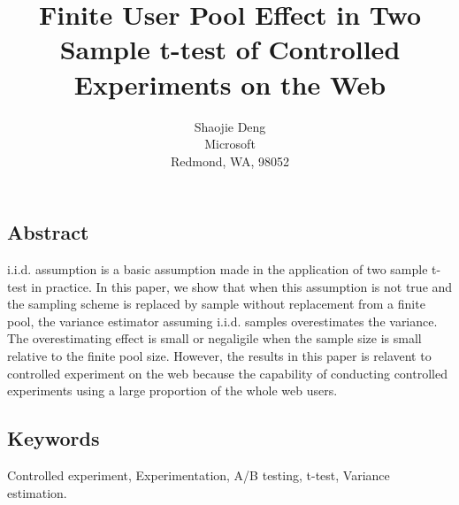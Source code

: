 \documentclass[10pt]{article}
\begin{document}
\date{}

\title{\Large\bf Finite User Pool Effect in Two Sample t-test of Controlled Experiments on the Web}

\author{Shaojie Deng \\
  Microsoft \\
  Redmond, WA, 98052}


\maketitle

\thispagestyle{empty}

\subsection*{Abstract}
i.i.d. assumption is a basic assumption made in the application of two sample t-test in practice. In this paper, we show that when this assumption is not true and the sampling scheme is replaced by sample without replacement from a finite pool, the variance estimator assuming i.i.d. samples overestimates the variance. The overestimating effect is small or negaligile when the sample size is small relative to the finite pool size. However, the results in this paper is relavent to controlled experiment on the web because the capability of conducting controlled experiments using a large proportion of the whole web users. 

\subsection*{Keywords}
Controlled experiment, Experimentation, A/B testing, t-test, Variance estimation. 
\end{document}
